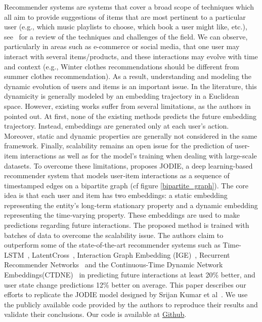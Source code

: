 Recommender systems are systems that cover a broad scope of techniques which all aim to provide suggestions of items that are most pertinent to a particular user (e.g., which music playlists to choose, which book a user might like, etc.), see~\cite{Ricci_Rokach_Shapira_2021} for a review of the techniques and challenges of the field. We can observe, particularly in areas such as  e-commerce or social media, that one user may interact with several items/products, and these interactions may evolve with time and context (e.g., Winter clothes recommendations should be different from summer clothes recommendation). 
As a result,  understanding and modeling the dynamic evolution of users and items is an important issue. In the literature, this dynamicity is generally modeled by an embedding trajectory in a Euclidean space. However, existing works suffer from several limitations, as the authors in \cite{kumar2019predicting} pointed out. At first, none of the existing methods predicts the future embedding trajectory. Instead, embeddings are generated only at each user's action. Moreover, static and dynamic properties are generally not considered in the same framework. Finally, scalability remains an open issue for the prediction of user-item interactions as well as for the model's training when dealing with large-scale datasets. To overcome these limitations, \cite{kumar2019predicting} proposes JODIE, a deep learning-based recommender system that models user‐item interactions as a sequence of timestamped edges on a bipartite graph (cf figure \ref{bipartite_graph}).
The core idea is that each user and item has two embeddings: a static embedding representing the entity's long‐term stationary property
and a dynamic embedding representing the time‐varying property. These embeddings are used to make predictions regarding future interactions. The proposed method is trained with batches of data to overcome the scalability issue.
The authors claim to outperform some of the state-of-the-art recommender systems such as Time-LSTM~\cite{Zhu17}, LatentCross~\cite{Beutel18}, Interaction Graph Embedding (IGE)~\cite{Zhang17}, Recurrent Recommender Networks~\cite{Wu17} and the Continuous-Time Dynamic Network Embeddings(CTDNE)~\cite{Nguyen18} in predicting future interactions  at least 20\% better, and user state change predictions 12\% better on average.
This paper describes our efforts to replicate the JODIE model designed by Srijan Kumar et al~\cite{kumar2019predicting}. 
We use the publicly available code provided by the authors to reproduce
their results and validate their conclusions. Our code is available at \href{https://github.com/ComplexNetTSP/JODIE}{Github}.


